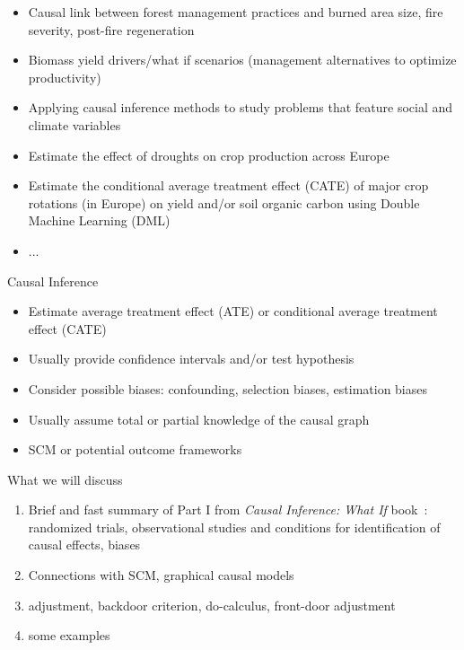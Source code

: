 \documentclass{beamer}
\begin{document}
\begin{frame}
	\begin{itemize}
		\item Causal link between forest management practices and burned area size, fire severity, post-fire regeneration 
		\item Biomass yield drivers/what if scenarios (management alternatives to optimize productivity)
		\item Applying causal inference methods to study problems that feature social and climate variables
		\item  Estimate the effect of droughts on crop production across Europe  
		\item Estimate the conditional average treatment effect (CATE) of major crop rotations (in Europe) on yield and/or soil organic carbon using Double Machine Learning (DML) 
		\item ...  
	\end{itemize}

\end{frame}

\begin{frame}{Causal Inference}
	\begin{itemize}
		\item  Estimate average treatment effect (ATE) or 
			conditional average treatment effect (CATE) 
		\item<2-> Usually provide confidence intervals and/or test hypothesis 
		\item<3-> Consider possible biases: confounding, selection biases, estimation biases  
		\item<4-> Usually assume total or partial knowledge of the causal graph 
		\item<5-> SCM or potential outcome frameworks  
	\end{itemize}
\end{frame}

\begin{frame}{What we will discuss}
	\begin{enumerate}
		\item Brief and fast summary of Part I from \emph{Causal Inference: What If} 
			book~\citep{whatif}: randomized trials, observational studies and 
			conditions for identification of causal effects, biases 
		\item Connections with SCM, graphical causal models 
		\item adjustment, backdoor criterion, do-calculus, front-door adjustment~\citep{peters2017elements} 
		\item some examples 
	\end{enumerate}
\end{frame}
\end{document}
